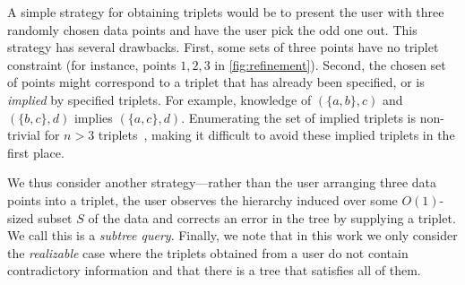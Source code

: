 A simple strategy for obtaining triplets 
would be to present the user with three randomly
chosen data points and have the user pick the odd one out.
This strategy has several drawbacks.
First, some sets of three points have no triplet constraint 
(for instance, points $1,2,3$ in \autoref{fig:refinement}).
Second, the chosen set of points might correspond to a triplet
that has already been specified, or is {\it implied} by 
specified triplets. For example, knowledge of $(\{a, b\}, c)$ and
$(\{b, c\}, d)$ implies $(\{a, c\}, d)$.
Enumerating the set of implied
triplets is non-trivial for $n > 3$ triplets~\citep{Bryant1995},
making it difficult to avoid these implied triplets
in the first place.

We thus consider another strategy---rather
than the user arranging three data points into
a triplet, the user observes
the hierarchy induced over some $O(1)$-sized
subset $S$ of the data and corrects
an error in the tree by supplying a triplet.
We call this is a \emph{subtree query}.
Finally, we note that in this work
we only consider the \emph{realizable} case
where the triplets obtained
from a user do not contain contradictory information
and that there is a tree that satisfies
all of them.

%


